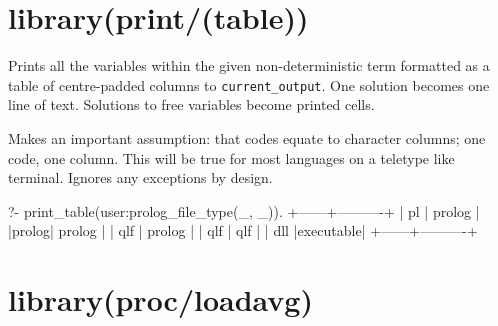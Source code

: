 \vspace{0.7cm}\chapter{library(print/(table))}\label{sec:table}

\begin{description}
\nodescription
Prints all the variables within the given non-deterministic 
term formatted as a table of centre-padded columns to
\verb$current_output$. One  solution becomes one line of text.
Solutions to free variables become printed cells.

Makes an important assumption: that codes equate to character
columns; one code, one column. This will be true for most languages
on a teletype like terminal. Ignores any exceptions by design.

\begin{code}
?- print_table(user:prolog_file_type(_, _)).
+------+----------+
|  pl  |  prolog  |
|prolog|  prolog  |
| qlf  |  prolog  |
| qlf  |   qlf    |
| dll  |executable|
+------+----------+
\end{code}

\end{description}

\chapter{library(proc/loadavg)}\label{sec:loadavg}

